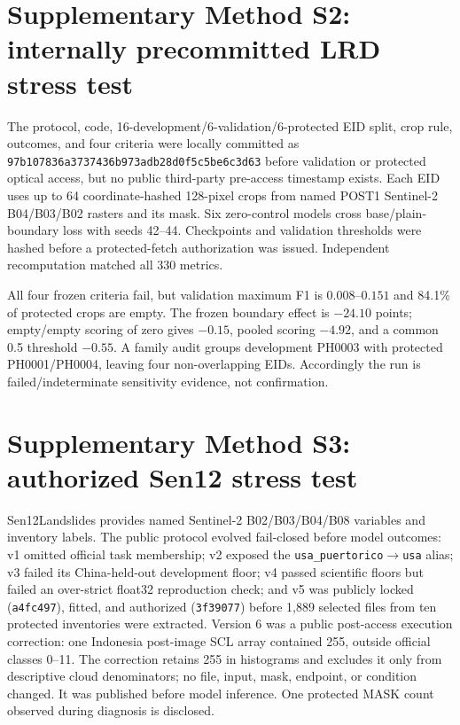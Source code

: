 \documentclass[11pt,a4paper]{article}
\begin{document}
\section*{Supplementary Method S2: internally precommitted LRD stress test}

The protocol, code, 16-development/6-validation/6-protected EID split, crop
rule, outcomes, and four criteria were locally committed as
\texttt{97b107836a3737436b973adb28d0f5c5be6c3d63} before validation or
protected optical access, but no public third-party pre-access timestamp exists.
Each EID uses up to 64 coordinate-hashed
128-pixel crops from named POST1 Sentinel-2 B04/B03/B02 rasters and its mask.
Six zero-control models cross base/plain-boundary loss with seeds 42--44.
Checkpoints and validation thresholds were hashed before a protected-fetch
authorization was issued. Independent recomputation matched all 330 metrics.

All four frozen criteria fail, but validation maximum F1 is $0.008$--$0.151$
and 84.1\% of protected crops are empty. The frozen boundary effect is
$-24.10$ points; empty/empty scoring of zero gives $-0.15$, pooled scoring
$-4.92$, and a common 0.5 threshold $-0.55$. A family audit groups development
PH0003 with protected PH0001/PH0004, leaving four non-overlapping EIDs.
Accordingly the run is failed/indeterminate sensitivity evidence, not
confirmation.

\begin{table}[htbp]
\centering
\caption{Frozen LRD plain-boundary minus base-loss effects. EID rows
average seeds; seed rows average six protected EIDs.}
\label{tab:s2}

\end{table}

\section*{Supplementary Method S3: authorized Sen12 stress test}

Sen12Landslides provides named Sentinel-2 B02/B03/B04/B08
variables and inventory labels. The public protocol evolved fail-closed before
model outcomes: v1 omitted official task membership; v2 exposed the
\texttt{usa\_puertorico}$\rightarrow$\texttt{usa} alias; v3 failed its
China-held-out development floor; v4 passed scientific floors but failed an
over-strict float32 reproduction check; and v5 was publicly locked
(\texttt{a4fc497}), fitted, and authorized (\texttt{3f39077}) before 1,889
selected files from ten protected inventories were extracted. Version 6 was a
public post-access execution correction: one Indonesia post-image SCL array
contained 255, outside official classes 0--11. The correction retains 255 in
histograms and excludes it only from descriptive cloud denominators; no file,
input, mask, endpoint, or condition changed. It was published before model
inference. One protected MASK count observed during diagnosis is disclosed.
\end{document}
